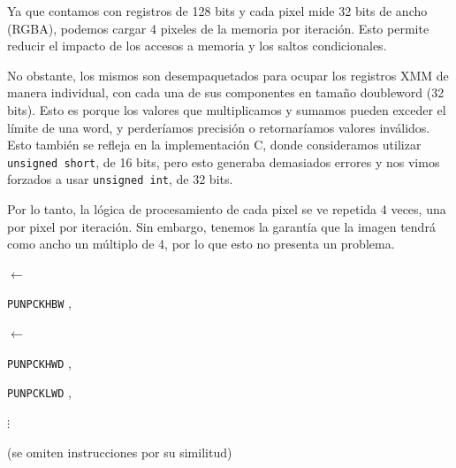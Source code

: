 \begin{center}
	 

	 

	 
\end{center}

Ya que contamos con registros de 128 bits y cada pixel mide 32 bits de ancho (RGBA), podemos cargar 4 pixeles de la memoria por iteración. Esto permite reducir el impacto de los accesos a memoria y los saltos condicionales.

No obstante, los mismos son desempaquetados para ocupar los registros XMM de manera individual, con cada una de sus componentes en tamaño doubleword (32 bits). Esto es porque los valores que multiplicamos y sumamos pueden exceder el límite de una word, y perderíamos precisión o retornaríamos valores inválidos. Esto también se refleja en la implementación C, donde consideramos utilizar \texttt{unsigned short}, de 16 bits, pero esto generaba demasiados errores y nos vimos forzados a usar \texttt{unsigned int}, de 32 bits.

Por lo tanto, la lógica de procesamiento de cada pixel se ve repetida 4 veces, una por pixel por iteración. Sin embargo, tenemos la garantía que la imagen tendrá como ancho un múltiplo de 4, por lo que esto no presenta un problema.

\begin{center}

	 

	 

	 $\leftarrow$ 

	\texttt{PUNPCKHBW} ,  \hfill

	 

	 $\leftarrow$ 

	\texttt{PUNPCKHWD} ,  \hfill

	\texttt{PUNPCKLWD} ,  \hfill

	 

	 

	$\vdots$

	(se omiten instrucciones por su similitud)

	 

	 

\end{center}

